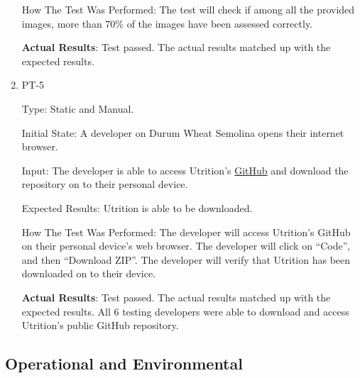 \documentclass[12pt, titlepage]{article}
\begin{document}
\begin{enumerate}
		How The Test Was Performed: The test will check if among all the 
		provided images, more than 70\% of the images have been assessed 
		correctly.
		
		\textbf{Actual Results}: Test passed. The actual results matched up with the expected results.
		
		\item{PT-5} 
		
		Type: Static and Manual.
		
		Initial State: A developer on Durum Wheat Semolina opens their internet browser.
		
		Input: The developer is able to access Utrition’s  \href{https://github.com/jeff-rey-wang/utrition}{GitHub} and download the repository on to their personal device.
		
		Expected Results: Utrition is able to be downloaded.
		
		How The Test Was Performed: The developer will access Utrition’s GitHub on their personal device’s web browser. The developer will click on “Code”, and then “Download ZIP”. The developer will verify that Utrition has been downloaded on to their device.
		
		\textbf{Actual Results}: Test passed. The actual results matched up with the expected results. All 6 testing developers were able to download and access Utrition's public GitHub repository.
		
	\end{enumerate}
	
	\subsection{Operational and Environmental}
	
\end{document}
